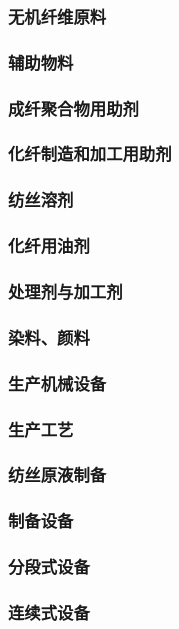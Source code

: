 \documentclass[UTF8]{../../ApplicationUniverse}
\begin{document}
        \subsubsection{无机纤维原料}
        \subsubsection{辅助物料}
            \subsubsection{成纤聚合物用助剂}
            \subsubsection{化纤制造和加工用助剂}
                \subsubsection{纺丝溶剂}
                \subsubsection{化纤用油剂}
                \subsubsection{处理剂与加工剂}
                \subsubsection{染料、颜料}
    \subsubsection{生产机械设备}
    \subsubsection{生产工艺}
        \subsubsection{纺丝原液制备}
            \subsubsection{制备设备}
                \subsubsection{分段式设备}
                \subsubsection{连续式设备}
\end{document}
